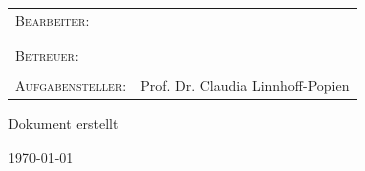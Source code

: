 \documentclass{article}
\begin{document}


\let\oldcontentsname\contentsname
\renewcommand{\contentsname}{\centering\small\oldcontentsname}

\title{\thesistitle}
\author{\authorA {} \authorB}
\date{\today}

\begin{titlepage}
	\centering
    \BgThispage
    \vspace*{-\topmargin}\vspace{-1in}%
    \vspace*{-\headheight}\vspace{-\headsep}%
    \vspace*{-\topskip}%
    \hspace*{-\oddsidemargin}
    \hspace*{-\marginparsep}
    \hspace*{-\marginparwidth}
	\vspace*{1.75cm}
	\par
	{\scshape\large \seminar\par}
	{\huge\bfseries\thesistitle\par}
	\vspace*{1.75cm}
	\large \begin{tabular}{ l l }
	  \textsc{Bearbeiter}:&{\authorA}\\
	  &{\authorB}\\
	  \\
	  \textsc{Betreuer:}&{\supervisor}\\
	  \\
	  \textsc{Aufgabensteller:}&{Prof. Dr. Claudia Linnhoff-Popien}\\
	\end{tabular}
	\par
	\vspace*{1.75cm}
	\begin{otherlanguage}{ngerman}
		{\large Dokument erstellt\par\today\par}
	\end{otherlanguage}
	\newpage
	\thispagestyle{empty}
	\mbox{}
	\newpage
\end{titlepage}
\cleardoublepage
\end{document}

